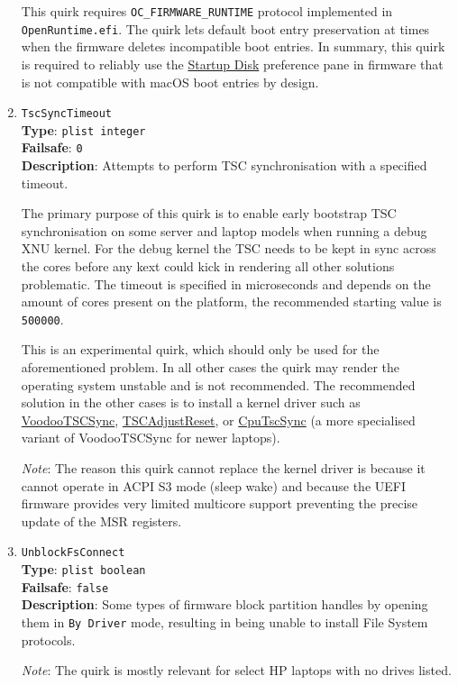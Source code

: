 \documentclass[]{article}
\begin{document}
\begin{enumerate}
  This quirk requires \texttt{OC\_FIRMWARE\_RUNTIME} protocol implemented
  in \texttt{OpenRuntime.efi}. The quirk lets default boot entry
  preservation at times when the firmware deletes incompatible boot entries.
  In summary, this quirk is required to reliably
  use the \href{https://support.apple.com/HT202796}{Startup Disk} preference
  pane in firmware that is not compatible with macOS boot entries by design.

\item
  \texttt{TscSyncTimeout}\\
  \textbf{Type}: \texttt{plist\ integer}\\
  \textbf{Failsafe}: \texttt{0}\\
  \textbf{Description}: Attempts to perform TSC synchronisation with a specified timeout.

  The primary purpose of this quirk is to enable early bootstrap TSC synchronisation
  on some server and laptop models when running a debug XNU kernel. For the debug kernel
  the TSC needs to be kept in sync across the cores before any kext could kick in rendering
  all other solutions problematic. The timeout is specified in microseconds and depends on the
  amount of cores present on the platform, the recommended starting value is \texttt{500000}.

  This is an experimental quirk, which should only be used for the aforementioned problem.
  In all other cases the quirk may render the operating system unstable and is not recommended.
  The recommended solution in the other cases is to install a kernel driver such as
  \href{https://github.com/RehabMan/VoodooTSCSync}{VoodooTSCSync},
  \href{https://github.com/interferenc/TSCAdjustReset}{TSCAdjustReset},
  or \href{https://github.com/lvs1974/CpuTscSync}{CpuTscSync} (a more specialised
  variant of VoodooTSCSync for newer laptops).

  \emph{Note}: The reason this quirk cannot replace the kernel driver is
  because it cannot operate in ACPI S3 mode (sleep wake) and because the UEFI firmware
  provides very limited multicore support preventing the precise update of the MSR
  registers.

\item
  \texttt{UnblockFsConnect}\\
  \textbf{Type}: \texttt{plist\ boolean}\\
  \textbf{Failsafe}: \texttt{false}\\
  \textbf{Description}: Some types of firmware block partition handles by opening them
  in \texttt{By\ Driver} mode, resulting in being unable to install File System protocols.

  \emph{Note}: The quirk is mostly relevant for select HP laptops with no drives listed.

\end{enumerate}
\end{document}
